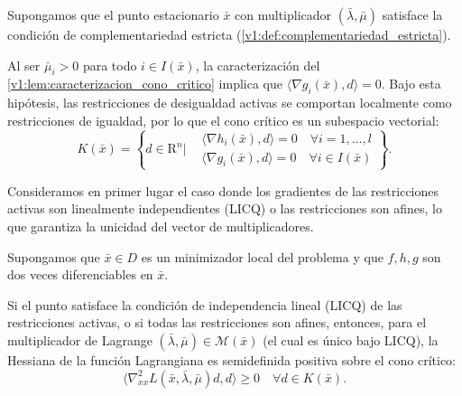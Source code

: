 \begin{corollary}\label{v1:cor:colapso_cono_critico}
 Supongamos que el punto estacionario $\bar{x}$ con multiplicador $(\bar{\lambda}, \bar{\mu})$ satisface la condición de complementariedad estricta (\cref{v1:def:complementariedad_estricta}).
 
 Al ser $\bar{\mu}_i > 0$ para todo $i \in I(\bar{x})$, la caracterización del \cref{v1:lem:caracterizacion_cono_critico} implica que $\langle \nabla g_i(\bar{x}), d \rangle = 0$. Bajo esta hipótesis, las restricciones de desigualdad activas se comportan localmente como restricciones de igualdad, por lo que el cono crítico es un subespacio vectorial:
 \[
 K(\bar{x}) = \left\{ d \in \mathrm{R}^n \mathrel{\Bigg|} \begin{aligned} &\langle \nabla h_i(\bar{x}), d \rangle = 0 \quad \forall i = 1, \dots, l \\
 &\langle \nabla g_i(\bar{x}), d \rangle = 0 \quad \forall i \in I(\bar{x}) \end{aligned}
 \right\}.
\]
\end{corollary}

Consideramos en primer lugar el caso donde los gradientes de las restricciones activas son linealmente independientes (LICQ) o las restricciones son afines, lo que garantiza la unicidad del vector de multiplicadores.

\begin{theorem}\label{v1:thm:4.3.1}
 Supongamos que $\bar{x} \in D$ es un minimizador local del problema y que $f, h, g$ son dos veces diferenciables en $\bar{x}$.
 
 Si el punto satisface la condición de independencia lineal (LICQ) de las restricciones activas, o si todas las restricciones son afines, entonces, para el multiplicador de Lagrange $(\bar{\lambda}, \bar{\mu}) \in \mathcal{M}(\bar{x})$ (el cual es único bajo LICQ), la Hessiana de la función Lagrangiana es semidefinida positiva sobre el cono crítico:
 \begin{equation}
 \langle \nabla_{xx}^2 L(\bar{x}, \bar{\lambda}, \bar{\mu})d, d \rangle \ge 0 \quad \forall d \in K(\bar{x}).
 \label{v1:eq:4.27}
 \end{equation}
\end{theorem}


